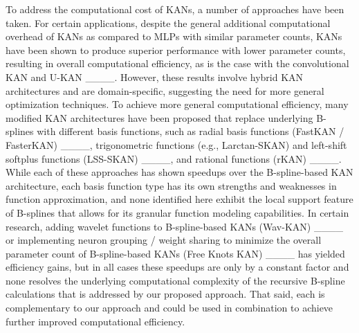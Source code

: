 To address the computational cost of KANs, a number of approaches have been taken.  For certain applications, despite the general additional computational overhead of KANs as compared to MLPs with similar parameter counts, KANs have been shown to produce superior performance with lower parameter counts, resulting in overall computational efficiency, as is the case with the convolutional KAN and U-KAN ____.  However, these results involve hybrid KAN architectures and are domain-specific, suggesting the need for more general optimization techniques.  To achieve more general computational efficiency, many modified KAN architectures have been proposed that replace underlying B-splines with different basis functions, such as radial basis functions (FastKAN / FasterKAN) ____, trigonometric functions (e.g., Larctan-SKAN) and left-shift softplus functions (LSS-SKAN) ____, and rational functions (rKAN) ____.  While each of these approaches has shown speedups over the B-spline-based KAN architecture, each basis function type has its own strengths and weaknesses in function approximation, and none identified here exhibit the local support feature of B-splines that allows for its granular function modeling capabilities. In certain research, adding wavelet functions to B-spline-based KANs (Wav-KAN) ____ or implementing neuron grouping / weight sharing to minimize the overall parameter count of B-spline-based KANs (Free Knots KAN) ____ has yielded efficiency gains, but in all cases these speedups are only by a constant factor and none resolves the underlying computational complexity of the recursive B-spline calculations that is addressed by our proposed approach.  That said, each is complementary to our approach and could be used in combination to achieve further improved computational efficiency.